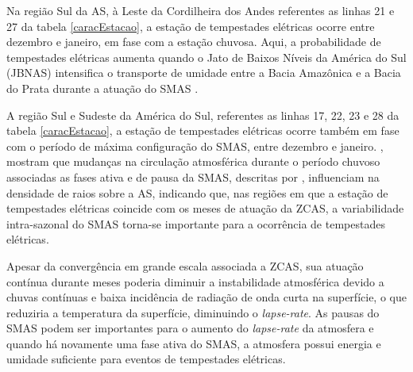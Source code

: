 
Na região Sul da AS, à Leste da Cordilheira dos Andes referentes as linhas  21 e 27 da tabela \ref{caracEstacao}, a estação de tempestades elétricas ocorre entre dezembro e janeiro, em fase com a estação chuvosa. Aqui, a probabilidade de tempestades elétricas aumenta quando o Jato de Baixos Níveis da América do Sul (JBNAS) intensifica o transporte de umidade entre a Bacia Amazônica e a Bacia do Prata durante a atuação do SMAS \cite{marengo2004}.   

A região Sul e Sudeste da América do Sul, referentes as linhas 17, 22, 23 e 28 da tabela \ref{caracEstacao}, a estação de tempestades elétricas ocorre também em fase com o período de máxima configuração do SMAS, entre dezembro e janeiro. , mostram que mudanças na circulação atmosférica durante o período chuvoso associadas as fases ativa e de pausa da SMAS, descritas por  , influenciam na densidade de raios sobre a AS,  indicando que, nas regiões em que a estação de tempestades elétricas coincide com os meses de  atuação da ZCAS, a variabilidade intra-sazonal do SMAS torna-se importante para a ocorrência de tempestades elétricas.

Apesar da convergência em grande escala associada a ZCAS, sua atuação contínua durante meses poderia diminuir a instabilidade atmosférica devido a chuvas contínuas e baixa incidência de radiação de onda curta na superfície, o que reduziria a temperatura da superfície, diminuindo o \textit{lapse-rate}. As pausas do SMAS podem ser importantes para o aumento do \textit{lapse-rate} da atmosfera e quando há novamente uma fase ativa do SMAS, a atmosfera possui energia e umidade suficiente para eventos de tempestades elétricas.


